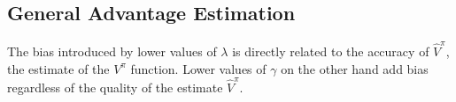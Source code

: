 \subsection{General Advantage Estimation}

The bias introduced by lower values of $\lambda$ is directly related to the accuracy of $\hat{V}^\pi$, the estimate of the $V^\pi$ function. Lower values of $\gamma$ on the other hand add bias regardless of the quality of the estimate $\hat{V}^\pi$.

%


